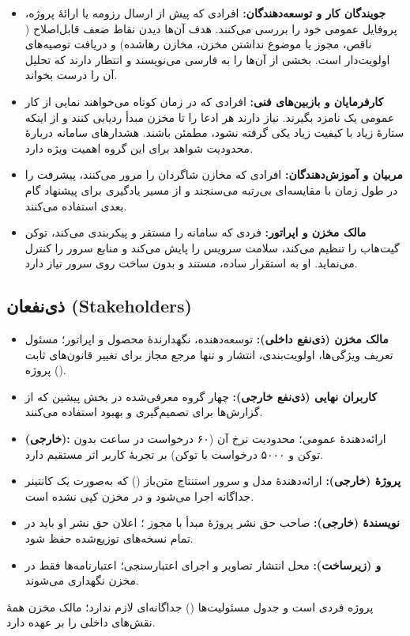 \documentclass[12pt]{article}
\begin{document}
 \begin{itemize}
\item \textbf{جویندگان کار و توسعه‌دهندگان:} افرادی که پیش از ارسال رزومه یا ارائهٔ پروژه، پروفایل عمومی خود را بررسی می‌کنند. هدف آن‌ها دیدن نقاط ضعف قابل‌اصلاح ( ناقص، مجوز یا موضوع نداشتن مخزن، مخازن رهاشده) و دریافت توصیه‌های اولویت‌دار است. بخشی از آن‌ها  را به فارسی می‌نویسند و انتظار دارند که تحلیل آن را درست بخواند.
\item \textbf{کارفرمایان و بازبین‌های فنی:} افرادی که در زمان کوتاه می‌خواهند نمایی از کار عمومی یک نامزد بگیرند. نیاز دارند هر ادعا را تا مخزن مبدأ ردیابی کنند و از اینکه ستارهٔ زیاد با کیفیت زیاد یکی گرفته نشود، مطمئن باشند. هشدارهای سامانه دربارهٔ محدودیت شواهد برای این گروه اهمیت ویژه دارد.
\item \textbf{مربیان و آموزش‌دهندگان:} افرادی که مخازن شاگردان را مرور می‌کنند، پیشرفت را در طول زمان با مقایسه‌ای بی‌رتبه می‌سنجند و از مسیر یادگیری برای پیشنهاد گام بعدی استفاده می‌کنند.
\item \textbf{مالک مخزن و اپراتور:} فردی که سامانه را مستقر و پیکربندی می‌کند، توکن گیت‌هاب را تنظیم می‌کند، سلامت سرویس را پایش می‌کند و منابع سرور را کنترل می‌نماید. او به استقرار ساده، مستند و بدون ساخت روی سرور نیاز دارد.
\end{itemize}
 \subsection{ذی‌نفعان (Stakeholders)}
\begin{itemize}
\item \textbf{مالک مخزن (ذی‌نفع داخلی):} توسعه‌دهنده، نگهدارندهٔ محصول و اپراتور؛ مسئول تعریف ویژگی‌ها، اولویت‌بندی، انتشار و تنها مرجع مجاز برای تغییر قانون‌های ثابت پروژه ().
\item \textbf{کاربران نهایی (ذی‌نفع خارجی):} چهار گروه معرفی‌شده در بخش پیشین که از گزارش‌ها برای تصمیم‌گیری و بهبود استفاده می‌کنند.
\item \textbf{ (خارجی):} ارائه‌دهندهٔ  عمومی؛ محدودیت نرخ آن (۶۰ درخواست در ساعت بدون توکن و ۵۰۰۰ درخواست با توکن) بر تجربهٔ کاربر اثر مستقیم دارد.
\item \textbf{پروژهٔ  (خارجی):} ارائه‌دهندهٔ مدل و سرور استنتاج متن‌باز () که به‌صورت یک کانتینر جداگانه اجرا می‌شود و در مخزن کپی نشده است.
\item \textbf{نویسندهٔ  (خارجی):} صاحب حق نشر پروژهٔ مبدأ با مجوز ؛ اعلان حق نشر او باید در تمام نسخه‌های توزیع‌شده حفظ شود.
\item \textbf{ و  (زیرساخت):} محل انتشار تصاویر و اجرای اعتبارسنجی؛ اعتبارنامه‌ها فقط در  مخزن نگهداری می‌شوند.
\end{itemize}
 پروژه فردی است و جدول مسئولیت‌ها () جداگانه‌ای لازم ندارد؛ مالک مخزن همهٔ نقش‌های داخلی را بر عهده دارد.
\end{document}
